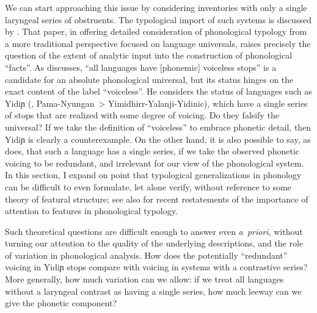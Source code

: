 \documentclass[output=paper,colorlinks,citecolor=brown]{langscibook}
\begin{document}
We can start approaching this issue by considering inventories with only a single laryngeal series of obstruents. The typological import of such systems is discussed by \textcite{hyman08:_univer}. That paper, in offering detailed consideration of phonological typology from a more traditional perspective focused on language universals, raises precisely the question of the extent of analytic input into the construction of phonological \enquote{facts}. As \textcite{hyman08:_univer} discusses,  \enquote{all languages have [phonemic] voiceless stops} is a candidate for an absolute phonological universal, but its status hinges on the exact content of the label \enquote{voiceless}. He considers the status of languages such as Yidiɲ (, Pama-Nyungan~> Yimidhirr\hyp Yalanji\hyp Yidinic), which have a single series of stops that are realized with some degree of voicing. Do they falsify the universal? If we take the definition of \enquote{voiceless} to embrace phonetic detail, then Yidiɲ is clearly a counterexample. On the other hand, it is also possible to say, as \textcite{hyman08:_univer} does, that such a language has a single {\VOICELESS} series, if we take the observed phonetic voicing to be redundant, and irrelevant for our view of the phonological system. In this section, I expand on  point that typological generalizations in phonology can be difficult to even formulate, let alone verify, without reference to some theory of featural structure; see also \textcite{vaux2009, dresher2018contrastive, youssef2021contrastive} for recent restatements of the importance of attention to features in phonological typology.

Such theoretical questions are difficult enough to answer even \emph{a~priori}, without turning our attention to the quality of the underlying descriptions, and the role of variation in phonological analysis. How does the potentially \enquote{redundant} voicing in Yidiɲ stops compare with voicing in systems with a contrastive {\VOICED} series? More generally, how much variation can we allow: if we treat all languages without a laryngeal contrast as having a single {\VOICELESS} series, how much leeway can we give the phonetic component?
\end{document}
